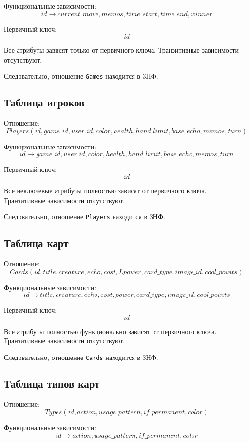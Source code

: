 Функциональные зависимости:
\[
	id \rightarrow current\_move,
	memos,
	time\_start,
	time\_end,
	winner
\]

Первичный ключ:
\[
	id
\]

Все атрибуты зависят только от первичного ключа.
Транзитивные зависимости отсутствуют.

Следовательно, отношение \texttt{Games} находится в 3НФ.

\subsection{Таблица игроков}

Отношение:
\[
	Players(
	id,
	game\_id,
	user\_id,
	color,
	health,
	hand\_limit,
	base\_echo,
	memos,
	turn
	)
\]

Функциональные зависимости:
\[
	id \rightarrow game\_id,
	user\_id,
	color,
	health,
	hand\_limit,
	base\_echo,
	memos,
	turn
\]

Первичный ключ:
\[
	id
\]

Все неключевые атрибуты полностью зависят от первичного ключа.
Транзитивные зависимости отсутствуют.

Следовательно, отношение \texttt{Players} находится в 3НФ.

\subsection{Таблица карт}

Отношение:
\[
	Cards(
	id,
	title,
	creature,
	echo,
	cost,L
	power,
	card\_type,
	image\_id,
	cool\_points
	)
\]

Функциональные зависимости:
\[
	id \rightarrow title,
	creature,
	echo,
	cost,
	power,
	card\_type,
	image\_id,
	cool\_points
\]

Первичный ключ:
\[
	id
\]

Все атрибуты полностью функционально зависят от первичного ключа.
Транзитивные зависимости отсутствуют.

Следовательно, отношение \texttt{Cards} находится в 3НФ.

\subsection{Таблица типов карт}

Отношение:
\[
	Types(
	id,
	action,
	usage\_pattern,
	if\_permanent,
	color
	)
\]

Функциональные зависимости:
\[
	id \rightarrow action,
	usage\_pattern,
	if\_permanent,
	color
\]

